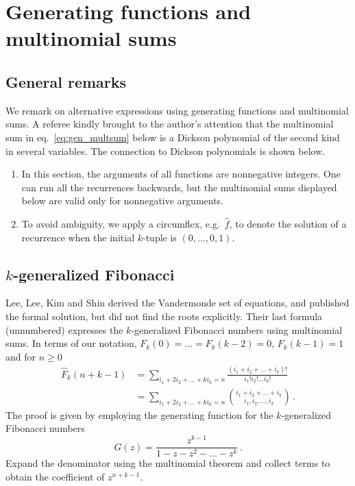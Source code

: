 \documentclass[review]{elsarticle}
\theoremstyle{plain}
\begin{document}
\setcounter{equation}{0}
\section{Generating functions and multinomial sums}\label{sec:mult_sum}
\subsection{General remarks}
We remark on alternative expressions using generating functions and multinomial sums.
A referee kindly brought to the author's attention that
the multinomial sum in eq.~\eqref{eq:gen_multsum} below is
a Dickson polynomial of the second kind in several variables.
The connection to Dickson polynomials is shown below.
\begin{enumerate}
\item  
In this section, the arguments of all functions are nonnegative integers.
One can run all the recurrences backwards,
but the multinomial sums displayed below are valid only for nonnegative arguments.
\item  
To avoid ambiguity, we apply a circumflex, e.g.~$\hat{f}$, to denote the solution of a recurrence
when the initial $k$-tuple is $(0,\dots,0,1)$.
\end{enumerate}
  
\subsection{$k$-generalized Fibonacci}
Lee, Lee, Kim and Shin \cite{LeeLeeKimShin}
derived the Vandermonde set of equations, and published the formal solution, but did not find the roots explicitly.
Their last formula (unnumbered) expresses the $k$-generalized Fibonacci numbers using multinomial sums.
In terms of our notation, $F_k(0)=\dots=F_k(k-2)=0$, $F_k(k-1)=1$ and for $n\ge0$
\begin{equation}
\label{eq:Fnk_multsum}
\begin{split}
  \hat{F}_k(n+k-1) &= \sum_{i_1+2i_2+\dots+ki_k = n} \frac{(i_1+i_2+\dots+i_k)!}{i_1!i_2!\dots i_k!} 
  \\
  &= \sum_{i_1+2i_2+\dots+ki_k = n} \binom{i_1+i_2+\dots+i_k}{i_1,i_2,\dots, i_k} \,.
\end{split}
\end{equation}
The proof is given by employing the generating function for the $k$-generalized Fibonacci numbers 
\begin{equation}
G(z) = \frac{z^{k-1}}{1-z-z^2 -\dots -z^k} \,.
\end{equation}
Expand the denominator using the multinomial theorem and collect terms to obtain the coefficient of $z^{n+k-1}$.
\end{document}
